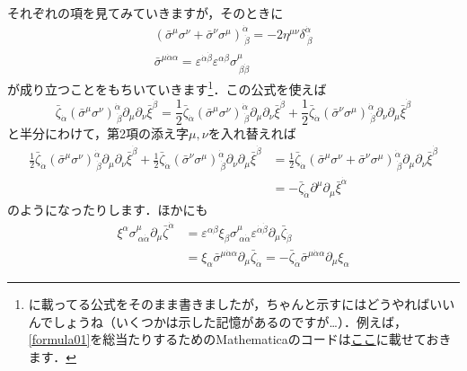 \documentclass[a4paper,uplatex,dvipdfmx]{jsarticle}
\theoremstyle{definition}
\begin{document}
それぞれの項を見てみていきますが，そのときに
\begin{gather}
  (
    \bar{\sigma}^{\mu}\sigma^{\nu}
    +
    \bar{\sigma}^{\nu}\sigma^{\mu}
  )^{\dot{\alpha}}_{\ \dot{\beta}}
  =
  -2\eta^{\mu\nu}\delta^{\dot{\alpha}}_{\ \dot{\beta}}
  \label{formula01}
  \\
  \bar{\sigma}^{\mu\dot{\alpha}\alpha}
  =
  \varepsilon^{\dot{\alpha}\dot{\beta}}\varepsilon^{\alpha\beta}
  \sigma^{\mu}_{\ \beta\dot{\beta}}
  \label{formula02}
\end{gather}
が成り立つことをもちいていきます\footnote{
  \cite{Wess_SupersymmetrySupergravity_1992}に載ってる公式をそのまま書きましたが，ちゃんと示すにはどうやればいいんでしょうね（いくつかは示した記憶があるのですが…）．例えば，\eqref{formula01}を総当たりするためのMathematicaのコードは\href{https://dxmegvpw.github.io/docs/nb/20231203.nb}{ここ}に載せておきます．
}．この公式を使えば
\begin{equation}
  \bar{\zeta}_{\dot{\alpha}}(\bar{\sigma}^{\mu}\sigma^{\nu})^{\dot{\alpha}}_{\ \dot{\beta}}\partial_{\mu}\partial_{\nu}\bar{\xi}^{\dot{\beta}}
  =
  \frac{1}{2}
  \bar{\zeta}_{\dot{\alpha}}(\bar{\sigma}^{\mu}\sigma^{\nu})^{\dot{\alpha}}_{\ \dot{\beta}}\partial_{\mu}\partial_{\nu}\bar{\xi}^{\dot{\beta}}
  +
  \frac{1}{2}
  \bar{\zeta}_{\dot{\alpha}}(\bar{\sigma}^{\nu}\sigma^{\mu})^{\dot{\alpha}}_{\ \dot{\beta}}\partial_{\nu}\partial_{\mu}\bar{\xi}^{\dot{\beta}}  
\end{equation}
と半分にわけて，第2項の添え字$\mu,\nu$を入れ替えれば
\begin{align}
  \frac{1}{2}
  \bar{\zeta}_{\dot{\alpha}}(\bar{\sigma}^{\mu}\sigma^{\nu})^{\dot{\alpha}}_{\ \dot{\beta}}\partial_{\mu}\partial_{\nu}\bar{\xi}^{\dot{\beta}}
  +
  \frac{1}{2}
  \bar{\zeta}_{\dot{\alpha}}(\bar{\sigma}^{\nu}\sigma^{\mu})^{\dot{\alpha}}_{\ \dot{\beta}}\partial_{\nu}\partial_{\mu}\bar{\xi}^{\dot{\beta}}  
  &=
  \frac{1}{2}
  \bar{\zeta}_{\dot{\alpha}}(\bar{\sigma}^{\mu}\sigma^{\nu}+\bar{\sigma}^{\nu}\sigma^{\mu})^{\dot{\alpha}}_{\ \dot{\beta}}\partial_{\mu}\partial_{\nu}\bar{\xi}^{\dot{\beta}}  
  \nonumber
  \\
  &=
  -\bar{\zeta}_{\dot{\alpha}}\partial^{\mu}\partial_{\mu}\bar{\xi}^{\dot{\alpha}}
\end{align}
のようになったりします．ほかにも
\begin{align}
  \xi^{\alpha}
  \sigma^{\mu}_{\ \alpha\dot{\alpha}}
  \partial_{\mu}\bar{\zeta}^{\dot{\alpha}}
  &=
  \varepsilon^{\alpha\beta}\xi_{\beta}
  \sigma^{\mu}_{\ \alpha\dot{\alpha}}
  \varepsilon^{\dot{\alpha}\dot{\beta}}
  \partial_{\mu}\bar{\zeta}_{\dot{\beta}}
  \nonumber
  \\
  &=
  \xi_{\alpha}
  \bar{\sigma}^{\mu\dot{\alpha}\alpha}
  \partial_{\mu}\bar{\zeta}_{\dot{\alpha}}
  =
  -
  \bar{\zeta}_{\dot{\alpha}}
  \bar{\sigma}^{\mu\dot{\alpha}\alpha}
  \partial_{\mu}
  \xi_{\alpha}
\end{align}
\end{document}

